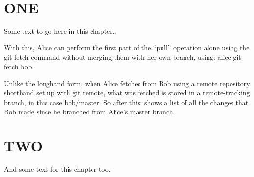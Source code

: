 \chapter*{ONE}
Some text to go here in this chapter\ldots

With this, Alice can perform the first part of the ``pull'' operation alone using the git fetch command without merging them with her own branch, using: alice git fetch bob.

Unlike the longhand form, when Alice fetches from Bob using a remote repository shorthand set up with git remote, what was fetched is stored in a remote-tracking branch, in this case bob/master. So after this: shows a list of all the changes that Bob made since he branched from Alice’s master branch.

\chapter*{TWO}
And some text for this chapter too.